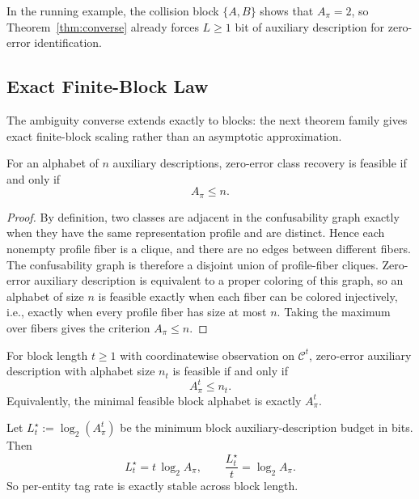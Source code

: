 In the running example, the collision block $\{A,B\}$ shows that $A_\pi = 2$, so Theorem~\ref{thm:converse} already forces $L \ge 1$ bit of auxiliary description for zero-error identification.

\subsection{Exact Finite-Block Law}

The ambiguity converse extends exactly to blocks: the next theorem family gives exact finite-block scaling rather than an asymptotic approximation.

\begin{theorem}\label{thm:graph-one-shot-threshold}
For an alphabet of $n$ auxiliary descriptions, zero-error class recovery is feasible if and only if
\[
A_\pi \le n.
\]
\end{theorem}

\begin{proof}
By definition, two classes are adjacent in the confusability graph exactly when they have the same representation profile and are distinct. Hence each nonempty profile fiber is a clique, and there are no edges between different fibers. The confusability graph is therefore a disjoint union of profile-fiber cliques. Zero-error auxiliary description is equivalent to a proper coloring of this graph, so an alphabet of size $n$ is feasible exactly when each fiber can be colored injectively, i.e., exactly when every profile fiber has size at most $n$. Taking the maximum over fibers gives the criterion $A_\pi \le n$.
\end{proof}

\begin{theorem}\label{thm:graph-block-threshold}
For block length $t\ge 1$ with coordinatewise observation on $\mathcal{C}^t$, zero-error auxiliary description with alphabet size $n_t$ is feasible if and only if
\[
A_\pi^t \le n_t.
\]
Equivalently, the minimal feasible block alphabet is exactly $A_\pi^t$.
\end{theorem}

\begin{corollary}\label{cor:graph-logbit-scaling}
Let $L_t^\star := \log_2(A_\pi^t)$ be the minimum block auxiliary-description budget in bits. Then
\[
L_t^\star = t\,\log_2 A_\pi,
\qquad
\frac{L_t^\star}{t} = \log_2 A_\pi.
\]
So per-entity tag rate is exactly stable across block length.
\end{corollary}

